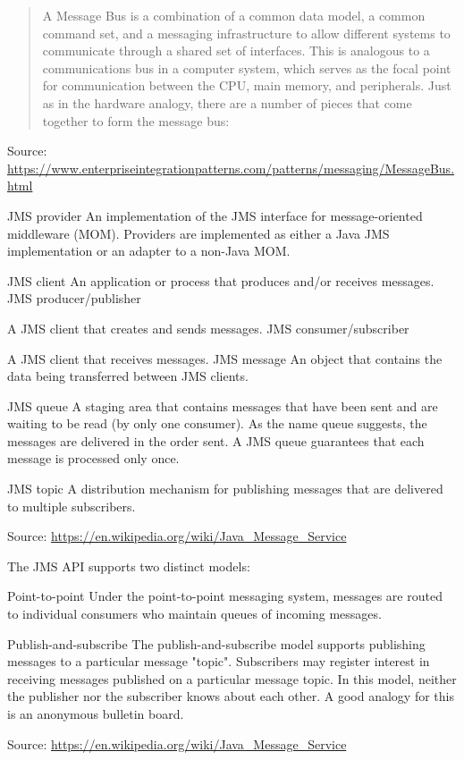 \documentclass[Screen16to9,17pt]{foils}
\begin{document}


\begin{quote}\footnotesize
A Message Bus is a combination of a common data model, a common command set, and a messaging infrastructure to allow different systems to communicate through a shared set of interfaces. This is analogous to a communications bus in a computer system, which serves as the focal point for communication between the CPU, main memory, and peripherals. Just as in the hardware analogy, there are a number of pieces that come together to form the message bus:
\end{quote}
Source: \url{https://www.enterpriseintegrationpatterns.com/patterns/messaging/MessageBus.html}



\begin{list2}
\item JMS provider
An implementation of the JMS interface for message-oriented middleware (MOM). Providers are implemented as either a Java JMS implementation or an adapter to a non-Java MOM.
\item JMS client
An application or process that produces and/or receives messages.
JMS producer/publisher
\item A JMS client that creates and sends messages.
JMS consumer/subscriber
\item A JMS client that receives messages.
JMS message
An object that contains the data being transferred between JMS clients.
\item JMS queue
A staging area that contains messages that have been sent and are waiting to be read (by only one consumer). As the name queue suggests, the messages are delivered in the order sent. A JMS queue guarantees that each message is processed only once.
\item JMS topic
A distribution mechanism for publishing messages that are delivered to multiple subscribers.
\end{list2}
Source: \url{https://en.wikipedia.org/wiki/Java_Message_Service}


The JMS API supports two distinct models:

\begin{list2}
\item Point-to-point Under the point-to-point messaging system, messages are routed to individual consumers who maintain queues of incoming messages.

\item Publish-and-subscribe The publish-and-subscribe model supports publishing messages to a particular message "topic". Subscribers may register interest in receiving messages published on a particular message topic. In this model, neither the publisher nor the subscriber knows about each other. A good analogy for this is an anonymous bulletin board.

\end{list2}
Source: \url{https://en.wikipedia.org/wiki/Java_Message_Service}
\end{document}

